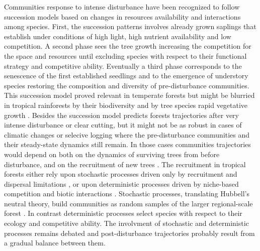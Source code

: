 \documentclass[fleqn,10pt]{ArtEcoFoG} %
\begin{document}
Communities response to intense disturbance have been recognized to
follow succession models based on changes in resources availability and
interactions among species. First, the succession patterns involves
already grown saplings that establish under conditions of high light,
high nutrient availability and low competition. A second phase sees the
tree growth increasing the competition for the space and resources until
excluding species with respect to their functional strategy and
competitive ability. Eventually a third phase corresponds to the
senescence of the first established seedlings and to the emergence of
understory species restoring the composition and diversity of
pre-disturbance communities. This succession model proved relevant in
temperate forests but might be blurried in tropical rainforests by their
biodiversity and by tree species rapid vegetative growth
\citep{Denslow2000}. Besides the succession model predicts forests
trajectories after very intense disturbance or clear cutting, but it
might not be as robust in cases of climatic changes or selecive logging
where the pre-disturbance communities and their steady-state dynamics
still remain. In those cases communities trajectories would depend on
both on the dynamics of surviving trees from before disturbance, and on
the recruitment of new trees \citep{Herault2018}. The recruitment in
tropical forests either rely upon stochastic processes driven only by
recruitment and dispersal limitations \citep{Hurtt1995, Hubbell2001}, or
upon deterministic processes driven by niche-based competition and
biotic interactions \citep{Adler2007}. Stochastic processes, translating
Hubbell's neutral theory, build communities as random samples of the
larger regional-scale forest \citep{Hubbell2001, Chave2004}. In contrast
deterministic processes select species with respect to their ecology and
competitive ability. The involvment of stochastic and deterministic
processes remains debated and post-disturbance trajectories probably
result from a gradual balance between them.
\end{document}
